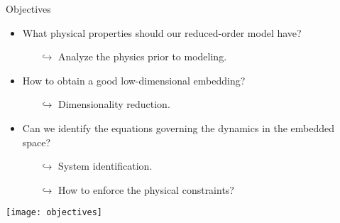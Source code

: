 \begin{frame}[t, c]{Objectives}
  \begin{minipage}{.68\textwidth}
    \begin{itemize}

			\item What physical properties should our reduced-order model have?
			\begin{itemize}
				\item[\(	\hookrightarrow	\)] Analyze the physics prior to modeling.
			\end{itemize}

			\medskip

      \item How to obtain a good low-dimensional embedding?
      \begin{itemize}
        \item[\(  \hookrightarrow \)] Dimensionality reduction.
      \end{itemize}

      \medskip

      \item Can we identify the equations governing the dynamics in the embedded space?
      \begin{itemize}
        \item[\(  \hookrightarrow	\)] System identification.
				\item[\(	\hookrightarrow	\)] How to enforce the physical constraints?
      \end{itemize}

    \end{itemize}
  \end{minipage}%
  \hfill
  \begin{minipage}{.28\textwidth}
		\centering
		\texttt{[image: objectives]}
  \end{minipage}

  \vspace{1cm}
\end{frame}
